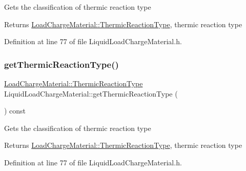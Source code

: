 Gets the classification of thermic reaction type \begin{DoxyReturn}{Returns}
\hyperlink{namespace_load_charge_material_a51d4263e865a5d86236622dd3fe23fd1}{Load\+Charge\+Material\+::\+Thermic\+Reaction\+Type}, thermic reaction type 
\end{DoxyReturn}


Definition at line 77 of file Liquid\+Load\+Charge\+Material.\+h.

\mbox{\label{class_liquid_load_charge_material_a181337f5e5cf6a47b82dd56897b49c29}} 
\subsubsection{\texorpdfstring{get\+Thermic\+Reaction\+Type()}{getThermicReactionType()}\hspace{0.1cm}{\footnotesize\ttfamily [2/3]}}
{\footnotesize\ttfamily \hyperlink{namespace_load_charge_material_a51d4263e865a5d86236622dd3fe23fd1}{Load\+Charge\+Material\+::\+Thermic\+Reaction\+Type} Liquid\+Load\+Charge\+Material\+::get\+Thermic\+Reaction\+Type (\begin{DoxyParamCaption}{ }\end{DoxyParamCaption}) const\hspace{0.3cm}{\ttfamily [inline]}}

Gets the classification of thermic reaction type \begin{DoxyReturn}{Returns}
\hyperlink{namespace_load_charge_material_a51d4263e865a5d86236622dd3fe23fd1}{Load\+Charge\+Material\+::\+Thermic\+Reaction\+Type}, thermic reaction type 
\end{DoxyReturn}


Definition at line 77 of file Liquid\+Load\+Charge\+Material.\+h.

\mbox{\label{class_liquid_load_charge_material_a181337f5e5cf6a47b82dd56897b49c29}} 
